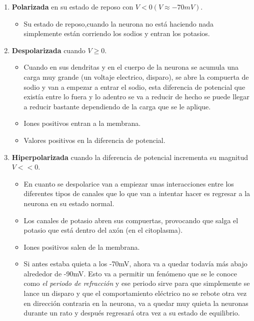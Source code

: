 \begin{enumerate}
 \item \textbf{Polarizada} en su estado de reposo con \(V < 0 ( V \approx -70mV )\).
 \begin{itemize}
  \item Su estado de reposo,cuando la neurona no está haciendo nada simplemente están corriendo los sodios y entran los potasios.
 \end{itemize}
 \item \textbf{Despolarizada} cuando \(V \geq 0\).
 \begin{itemize}
  \item Cuando en sus dendritas y en el cuerpo de la neurona se acumula una carga muy grande (un voltaje electrico, disparo), se abre la compuerta de sodio y van a empezar a entrar el sodio, esta diferencia de potencial que existía entre lo fuera y lo adentro se va a reducir de hecho se puede llegar a reducir bastante dependiendo de la carga que se le aplique.
  \item Iones positivos entran a la membrana.
  \item Valores positivos en la diferencia de potencial.    
 \end{itemize}
 \item \textbf{Hiperpolarizada} cuando la diferencia de potencial incrementa su magnitud \(V << 0\).
 \begin{itemize}
 \item En cuanto se despolarice van a empiezar unas interacciones  entre los diferentes tipos de canales que lo que van a intentar hacer es regresar a la neurona en su estado normal.
 \item Los canales de potasio abren sus compuertas, provocando que salga el potasio que está dentro del axón (en el citoplasma). 
 \item Iones positivos salen de la membrana.
 \item Si antes estaba quieta a los -70mV, ahora va a quedar todavía más abajo alrededor de -90mV. Esto va a permitir un fenómeno que se le conoce como \emph{el periodo de refracción} y ese periodo sirve para que simplemente se lance un disparo y que el comportamiento eléctrico no se rebote otra vez en dirección contraria en la neurona, va a quedar muy quieta la neuronas durante un rato y después regresará otra vez a su estado de equilibrio. 
 \end{itemize}

\end{enumerate}
 

